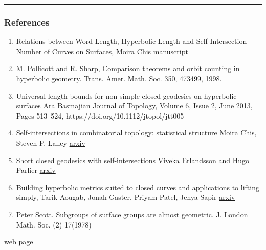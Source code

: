 \documentclass[
]{article}
\providecommand{\tightlist}{%
  \setlength{\itemsep}{0pt}\setlength{\parskip}{0pt}}
\begin{document}
\begin{center}\rule{0.5\linewidth}{0.5pt}\end{center}

\hypertarget{references}{%
\subsubsection{References}\label{references}}

\begin{enumerate}
\def\labelenumi{\arabic{enumi}.}
\tightlist
\item
  Relations between Word Length, Hyperbolic Length and Self-Intersection
  Number of Curves on Surfaces, Moira Chis
  \href{http://www.math.stonybrook.edu/~moira/papers/2015ChisRelations_between_Word_Length_Hyperbolic_Length_and_Self-Intersection_Number_of_Curves_on_Surfaces.pdf}{manuscript}
\item
  M. Pollicott and R. Sharp, Comparison theorems and orbit counting in
  hyperbolic geometry. Trans. Amer. Math. Soc. 350, 473499, 1998.
\item
  Universal length bounds for non-simple closed geodesics on hyperbolic
  surfaces Ara Basmajian Journal of Topology, Volume 6, Issue 2, June
  2013, Pages 513--524, https://doi.org/10.1112/jtopol/jtt005
\item
  Self-intersections in combinatorial topology: statistical structure
  Moira Chis, Steven P. Lalley
  \href{https://arxiv.org/abs/1012.0580}{arxiv}
\item
  Short closed geodesics with self-intersections Viveka Erlandsson and
  Hugo Parlier \href{https://arxiv.org/pdf/1609.00217.pdf}{arxiv}
\item
  Building hyperbolic metrics suited to closed curves and applications
  to lifting simply, Tarik Aougab, Jonah Gaster, Priyam Patel, Jenya
  Sapir \href{https://arxiv.org/abs/1603.06303}{arxiv}
\item
  Peter Scott. Subgroups of surface groups are almost geometric. J.
  London Math. Soc. (2) 17(1978)
\end{enumerate}

\href{https://github.com/macbuse/MATH/edit/master/stage\%20m2r\%202020_bis.md}{web
page}
\end{document}

